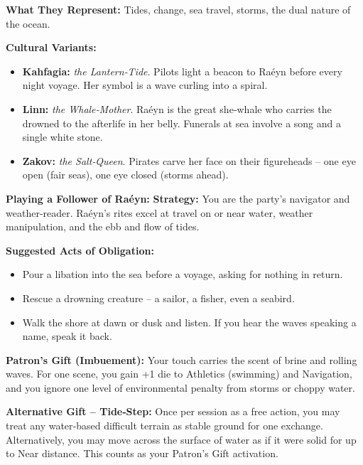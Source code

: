 \documentclass[10pt,a5paper]{book}
\begin{document}
\textbf{What They Represent:} Tides, change, sea travel, storms, the dual nature of the ocean.

\textbf{Cultural Variants:}
\begin{itemize}
    \item \textbf{Kahfagia:} \textit{the Lantern‑Tide}. Pilots light a beacon to Raéyn before every night voyage. Her symbol is a wave curling into a spiral.
    \item \textbf{Linn:} \textit{the Whale‑Mother}. Raéyn is the great she‑whale who carries the drowned to the afterlife in her belly. Funerals at sea involve a song and a single white stone.
    \item \textbf{Zakov:} \textit{the Salt‑Queen}. Pirates carve her face on their figureheads -- one eye open (fair seas), one eye closed (storms ahead).
\end{itemize}

\textbf{Playing a Follower of Raéyn:}
\textbf{Strategy:} You are the party's navigator and weather‑reader. Raéyn's rites excel at travel on or near water, weather manipulation, and the ebb and flow of tides.

\textbf{Suggested Acts of Obligation:}
\begin{itemize}
    \item Pour a libation into the sea before a voyage, asking for nothing in return.
    \item Rescue a drowning creature -- a sailor, a fisher, even a seabird.
    \item Walk the shore at dawn or dusk and listen. If you hear the waves speaking a name, speak it back.
\end{itemize}

\textbf{Patron's Gift (Imbuement):} Your touch carries the scent of brine and rolling waves. For one scene, you gain +1 die to Athletics (swimming) and Navigation, and you ignore one level of environmental penalty from storms or choppy water.

\textbf{Alternative Gift -- Tide‑Step:} Once per session as a free action, you may treat any water‑based difficult terrain as stable ground for one exchange. Alternatively, you may move across the surface of water as if it were solid for up to Near distance. This counts as your Patron's Gift activation.
\end{document}
